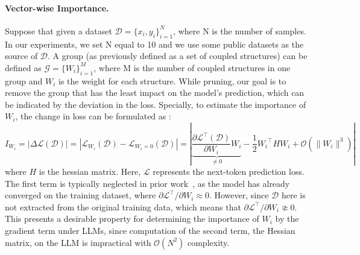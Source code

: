 \documentclass{article}
\begin{document}
\paragraph{Vector-wise Importance.} Suppose that given a dataset $\mathcal{D} = \{x_i, y_i\}_{i=1}^N$, where N is the number of samples. In our experiments, we set N equal to 10 and we use some public datasets as the source of $\mathcal{D}$. A group (as previously defined as a set of coupled structures) can be defined as $\mathcal{G} = \{W_i\}_{i=1}^M$, where M is the number of coupled structures in one group and $W_i$ is the weight for each structure. While pruning, our goal is to remove the group that has the least impact on the model's prediction, which can be indicated by the deviation in the loss. Specially, to estimate the importance of $W_i$, the change in loss can be formulated as \cite{lecun1989optimal}:
\begin{equation}
    I_{W_i} = | \Delta \mathcal{L}(\mathcal{D})| = |\mathcal{L}_{W_i}(\mathcal{D}) - \mathcal{L}_{W_i=0}(\mathcal{D})| =| \underbrace{\frac{\partial \mathcal{L}^{\top}(\mathcal{D})}{\partial W_i} W_i}_{\neq 0}-\frac{1}{2} {W_i}^{\top} H W_i + \mathcal{O}\left(\| W_i \|^3\right) | \label{eq:taylor}
\end{equation} 
where $H$ is the hessian matrix. Here, $\mathcal{L}$ represents the next-token prediction loss. The first term is typically neglected in prior work~\cite{lecun1989optimal,wang2019eigendamage,frantar2023massive}, as the model has already converged on the training dataset, where ${\partial \mathcal{L}^{\top}}/{\partial W_i} \approx 0$. However, since $\mathcal{D}$ here is not extracted from the original training data, which means that ${\partial \mathcal{L}^{\top}}/{\partial W_i} \not \approx 0$. This presents a desirable property for determining the importance of $W_i$ by the gradient term under LLMs, since computation of the second term, the Hessian matrix, on the LLM is impractical with $\mathcal{O}\left(N^2\right)$ complexity. 
\end{document}
